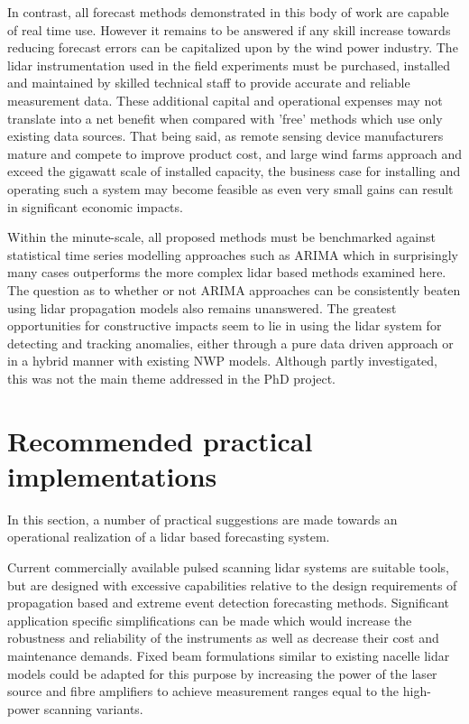 In contrast, all forecast methods demonstrated in this body of work are capable of real time use. However it remains to be answered if any skill increase towards reducing forecast errors can be capitalized upon by the wind power industry. The lidar instrumentation used in the field experiments must be purchased, installed and maintained by skilled technical staff to provide accurate and reliable measurement data. These additional capital and operational expenses may not translate into a net benefit when compared with 'free' methods which use only existing data sources. That being said, as remote sensing device manufacturers mature and compete to improve product cost, and large wind farms approach and exceed the gigawatt scale of installed capacity, the business case for installing and operating such a system may become feasible as even very small gains can result in significant economic impacts.

Within the minute-scale, all proposed methods must be benchmarked against statistical time series modelling approaches such as ARIMA which in surprisingly many cases outperforms the more complex lidar based methods examined here. The question as to whether or not ARIMA approaches can be consistently beaten using lidar propagation models also remains unanswered. The greatest opportunities for constructive impacts seem to lie in using the lidar system for detecting and tracking anomalies, either through a pure data driven approach or in a hybrid manner with existing NWP models. Although partly investigated, this was not the main theme addressed in the PhD project.

\clearpage
\section{Recommended practical implementations}
\label{sec:discussion_practical}

In this section, a number of practical suggestions are made towards an operational realization of a lidar based forecasting system.

Current commercially available pulsed scanning lidar systems are suitable tools, but are designed with excessive capabilities relative to the design requirements of propagation based and extreme event detection forecasting methods. Significant application specific simplifications can be made which would increase the robustness and reliability of the instruments as well as decrease their cost and maintenance demands. Fixed beam formulations similar to existing nacelle lidar models could be adapted for this purpose by increasing the power of the laser source and fibre amplifiers to achieve measurement ranges equal to the high-power scanning variants.

